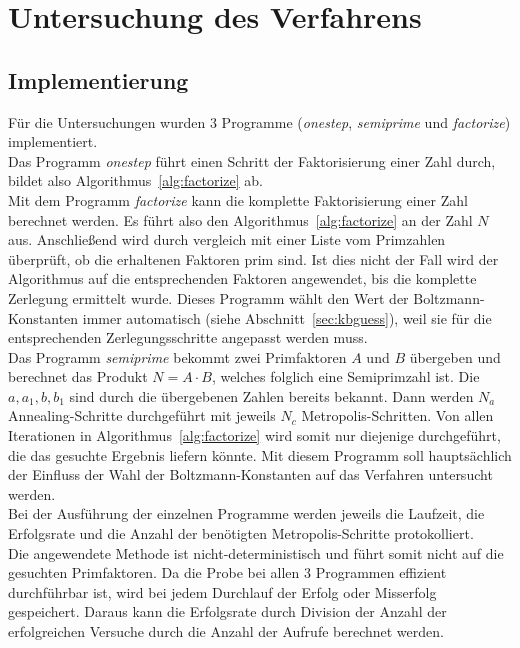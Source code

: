 \chapter{Untersuchung des Verfahrens}\label{ch:results}

\section{Implementierung}
Für die Untersuchungen wurden $3$ Programme (\textit{onestep}, \textit{semiprime} und \textit{factorize}) implementiert.  \\
Das Programm \textit{onestep} führt einen Schritt der Faktorisierung einer Zahl durch, bildet also Algorithmus~\ref{alg:factorize} ab. \\
Mit dem Programm \textit{factorize} kann die komplette Faktorisierung einer Zahl berechnet werden. Es führt also den Algorithmus~\ref{alg:factorize} an der Zahl $N$ aus. Anschließend wird durch vergleich mit einer Liste vom Primzahlen überprüft, ob die erhaltenen Faktoren prim sind. Ist dies nicht der Fall wird der Algorithmus auf die entsprechenden Faktoren angewendet, bis die komplette Zerlegung ermittelt wurde. Dieses Programm wählt den Wert der Boltzmann-Konstanten immer automatisch (siehe Abschnitt~\ref{sec:kbguess}), weil sie für die entsprechenden Zerlegungsschritte angepasst werden muss.\\
Das Programm \textit{semiprime} bekommt zwei Primfaktoren $A$ und $B$ übergeben und berechnet das Produkt $N=A\cdot B$, welches folglich eine Semiprimzahl ist. Die $a, a_1, b, b_1$ sind durch die übergebenen Zahlen bereits bekannt. Dann werden $N_a$ Annealing-Schritte durchgeführt mit jeweils $N_c$ Metropolis-Schritten. Von allen Iterationen in Algorithmus~\ref{alg:factorize} wird somit nur diejenige durchgeführt, die das gesuchte Ergebnis liefern könnte. Mit diesem Programm soll hauptsächlich der Einfluss der Wahl der Boltzmann-Konstanten auf das Verfahren untersucht werden. \\
Bei der Ausführung der einzelnen Programme werden jeweils die Laufzeit, die Erfolgsrate und die Anzahl der benötigten Metropolis-Schritte protokolliert. \\
Die angewendete Methode ist nicht-deterministisch und führt somit nicht auf die gesuchten Primfaktoren. Da die Probe bei allen $3$ Programmen effizient durchführbar ist, wird bei jedem Durchlauf der Erfolg oder Misserfolg gespeichert. Daraus kann die Erfolgsrate durch Division der Anzahl der erfolgreichen Versuche durch die Anzahl der Aufrufe berechnet werden. \\

